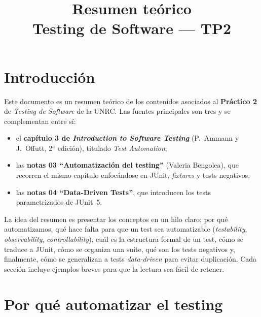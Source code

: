 \documentclass[12pt,a4paper]{article}
\title{\textbf{Resumen teórico}\\Testing de Software --- TP2}
\author{}
\date{}
\begin{document}
\maketitle
\tableofcontents
\newpage

\section*{Introducción}
Este documento es un resumen teórico de los contenidos asociados al \textbf{Práctico 2} de \textit{Testing de Software} de la UNRC. Las fuentes principales son tres y se complementan entre sí:
\begin{itemize}
  \item el \textbf{capítulo 3 de \textit{Introduction to Software Testing}} (P.~Ammann y J.~Offutt, 2$^{a}$ edición), titulado \textit{Test Automation};
  \item las \textbf{notas 03 ``Automatización del testing''} (Valeria Bengolea), que recorren el mismo capítulo enfocándose en JUnit, \textit{fixtures} y tests negativos;
  \item las \textbf{notas 04 ``Data-Driven Tests''}, que introducen los tests parametrizados de JUnit~5.
\end{itemize}

La idea del resumen es presentar los conceptos en un hilo claro: por qué automatizamos, qué hace falta para que un test sea automatizable (\textit{testability}, \textit{observability}, \textit{controllability}), cuál es la estructura formal de un test, cómo se traduce a JUnit, cómo se organiza una suite, qué son los tests negativos y, finalmente, cómo se generalizan a tests \textit{data-driven} para evitar duplicación. Cada sección incluye ejemplos breves para que la lectura sea fácil de retener.

\section{Por qué automatizar el testing}
\end{document}
